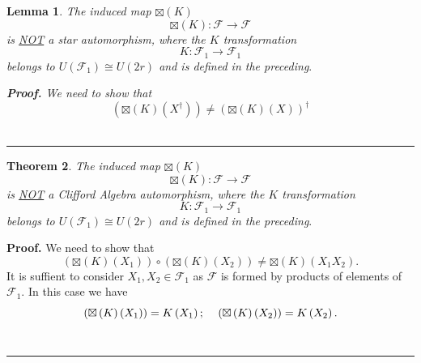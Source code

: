 \documentclass[aps, preprint]{revtex4}
\newtheorem{theorem}{Theorem}
\newtheorem{lemma}[theorem]{Lemma}
\newenvironment{proof}[1][Proof]{\noindent\textbf{#1.} }{\ \rule{0.5em}{0.5em}}
\begin{document}
\begin{lemma}
The induced map $ \boxtimes \left (K\right )$
\begin{equation} \boxtimes \left (K\right ) :\mathcal{F} \rightarrow \mathcal{F}
\end{equation}is \underline {\emph{NOT}} a \emph{star} automorphism, where the $K$ transformation
\begin{equation}K :\mathcal{F}_{1} \rightarrow \mathcal{F}_{1}
\end{equation}belongs to $U \left (\mathcal{F}_{1}\right ) \cong U \left (2 r\right )$ and is defined in the preceding$\text{.}$ 


\begin{proof}
We need to show that
\begin{equation}\left ( \boxtimes \left (K\right ) \left (X^{ \dag }\right )\right ) \neq \left ( \boxtimes \left (K\right ) \left (X\right )\right )^{ \dag }
\end{equation}
\end{proof}


\end{lemma}


\begin{theorem}
The induced map $ \boxtimes \left (K\right )$
\begin{equation} \boxtimes \left (K\right ) :\mathcal{F} \rightarrow \mathcal{F}
\end{equation}is \underline {\emph{NOT}} a \emph{Clifford Algebra} automorphism, where
the $K$ transformation
\begin{equation}K :\mathcal{F}_{1} \rightarrow \mathcal{F}_{1}
\end{equation}belongs to $U \left (\mathcal{F}_{1}\right ) \cong U \left (2 r\right )$ and is defined in the preceding$\text{.}$ 
\end{theorem}


\begin{proof}
We need to show that
\begin{equation}\left ( \boxtimes \left (K\right ) \left (X_{1}\right )\right ) \circ \left ( \boxtimes \left (K\right ) \left (X_{2}\right )\right )  \neq  \boxtimes \left (K\right ) \left (X_{1} X_{2}\right )\text{.}
\end{equation}It is suffient to consider $X_{1} ,X_{2} \in \mathcal{F}_{1}$ as $\mathcal{F}$ is formed by products of elements of $\mathcal{F}_{1}\text{.}$ In this case we have
\begin{equation}\left ( \boxtimes \left (K\right ) \left (X_{1}\right )\right ) =K \left (X_{1}\right ) ;\text{\quad }\left ( \boxtimes \left (K\right ) \left (X_{2}\right )\right ) =K \left (X_{2}\right )\text{.}
\end{equation}
\end{proof}
\end{document}
